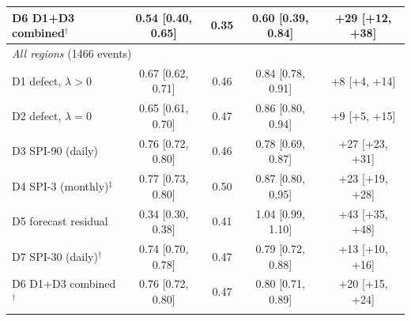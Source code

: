 \begin{table}[tbp]
\begin{tabular*}{\textwidth}{@{\extracolsep\fill}lcccc}
\quad D6 D1+D3 combined$^{\dagger}$ & 0.54 [0.40, 0.65] & 0.35 & 0.60 [0.39, 0.84] & +29 [+12, +38] \\
\midrule
\multicolumn{5}{l}{\textit{All regions} (1466 events)}\\
\quad D1 defect, $\lambda>0$ & 0.67 [0.62, 0.71] & 0.46 & 0.84 [0.78, 0.91] & +8 [+4, +14] \\
\quad D2 defect, $\lambda=0$ & 0.65 [0.61, 0.70] & 0.47 & 0.86 [0.80, 0.94] & +9 [+5, +15] \\
\quad D3 SPI-90 (daily) & 0.76 [0.72, 0.80] & 0.46 & 0.78 [0.69, 0.87] & +27 [+23, +31] \\
\quad D4 SPI-3 (monthly)$^{\ddagger}$ & 0.77 [0.73, 0.80] & 0.50 & 0.87 [0.80, 0.95] & +23 [+19, +28] \\
\quad D5 forecast residual & 0.34 [0.30, 0.38] & 0.41 & 1.04 [0.99, 1.10] & +43 [+35, +48] \\
\quad D7 SPI-30 (daily)$^{\dagger}$ & 0.74 [0.70, 0.78] & 0.47 & 0.79 [0.72, 0.88] & +13 [+10, +16] \\
\quad D6 D1+D3 combined$^{\dagger}$ & 0.76 [0.72, 0.80] & 0.47 & 0.80 [0.71, 0.89] & +20 [+15, +24] \\
\botrule
\end{tabular*}
\end{table}
